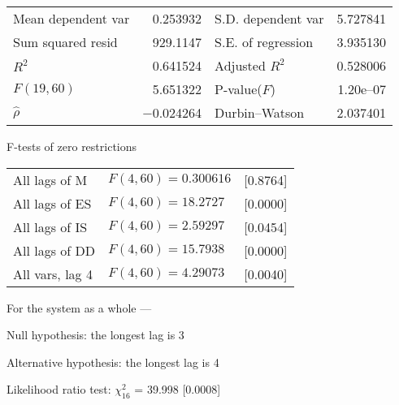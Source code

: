 \documentclass[11pt]{article}
\begin{document}
\begin{center}
\vspace{1ex}
\begin{tabular}{lrlr}
Mean dependent var &  0.253932 & S.D. dependent var &  5.727841 \\
Sum squared resid &  929.1147 & S.E. of regression &  3.935130 \\
$R^2$ &  0.641524 & Adjusted $R^2$ &  0.528006 \\
$F(19, 60)$ &  5.651322 & P-value($F$) &  1.20\textrm{e--07} \\
$\hat{\rho}$ & $-$0.024264 & Durbin--Watson &  2.037401 \\
\end{tabular}


\end{center}

\begin{center}
F-tests of zero restrictions\\[1em]
\begin{tabular}{lll}
All lags of M & $F(4, 60) = 0.300616$ & [0.8764]\\
All lags of ES & $F(4, 60) = 18.2727$ & [0.0000]\\
All lags of IS & $F(4, 60) = 2.59297$ & [0.0454]\\
All lags of DD & $F(4, 60) = 15.7938$ & [0.0000]\\
All vars, lag 4 & $F(4, 60) = 4.29073$ & [0.0040]\\
\end{tabular}
\end{center}

\clearpage


\noindent For the system as a whole ---\par
Null hypothesis: the longest lag is 3\par
Alternative hypothesis: the longest lag is 4\par
Likelihood ratio test: $\chi^2_{16}$ = 39.998 [0.0008]\par
\end{document}
